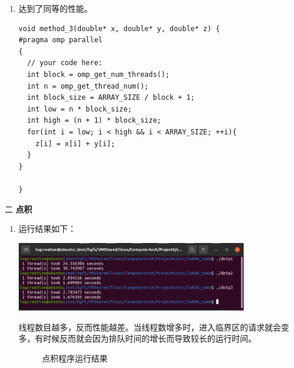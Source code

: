 \documentclass[12pt,a4paper]{article}
\newenvironment{problems}{\begin{list}{}{\renewcommand{\makelabel}[1]{\textbf{##1}.\hfil}}}{\end{list}}
\begin{document}
\begin{problems}
\begin{enumerate}
		\item 达到了同等的性能。
		\begin{lstlisting}
void method_3(double* x, double* y, double* z) {
#pragma omp parallel
{
  // your code here:
  int block = omp_get_num_threads();
  int n = omp_get_thread_num();
  int block_size = ARRAY_SIZE / block + 1;
  int low = n * block_size;
  int high = (n + 1) * block_size;
  for(int i = low; i < high && i < ARRAY_SIZE; ++i){
    z[i] = x[i] + y[i];
  }
}

}
		\end{lstlisting}
	\end{enumerate}
	
	\item[二] \textbf{点积}
	
	\begin{enumerate}
		


		\item 运行结果如下：
		
		\includegraphics[width=0.8\textwidth]{dotp.png}
		
		线程数目越多，反而性能越差。当线程数增多时，进入临界区的请求就会变多，有时候反而就会因为排队时间的增长而导致较长的运行时间。

		\begin{figure}[h]
			\centering
			\caption{点积程序运行结果}
		\end{figure}


\end{enumerate}
\end{problems}
\end{document}
